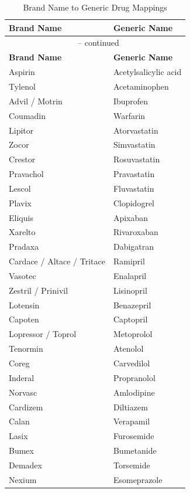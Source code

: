 \documentclass[11pt,a4paper]{article}
\begin{document}
\begin{longtable}{ll}
\caption{Brand Name to Generic Drug Mappings} \\
\toprule
\textbf{Brand Name} & \textbf{Generic Name} \\
\midrule
\endfirsthead
\multicolumn{2}{c}{{\tablename\ \thetable{} -- continued}} \\
\toprule
\textbf{Brand Name} & \textbf{Generic Name} \\
\midrule
\endhead
\bottomrule
\endfoot
\bottomrule
\endlastfoot
Aspirin & Acetylsalicylic acid \\
Tylenol & Acetaminophen \\
Advil / Motrin & Ibuprofen \\
Coumadin & Warfarin \\
\midrule
Lipitor & Atorvastatin \\
Zocor & Simvastatin \\
Crestor & Rosuvastatin \\
Pravachol & Pravastatin \\
Lescol & Fluvastatin \\
\midrule
Plavix & Clopidogrel \\
Eliquis & Apixaban \\
Xarelto & Rivaroxaban \\
Pradaxa & Dabigatran \\
\midrule
Cardace / Altace / Tritace & Ramipril \\
Vasotec & Enalapril \\
Zestril / Prinivil & Lisinopril \\
Lotensin & Benazepril \\
Capoten & Captopril \\
\midrule
Lopressor / Toprol & Metoprolol \\
Tenormin & Atenolol \\
Coreg & Carvedilol \\
Inderal & Propranolol \\
\midrule
Norvasc & Amlodipine \\
Cardizem & Diltiazem \\
Calan & Verapamil \\
\midrule
Lasix & Furosemide \\
Bumex & Bumetanide \\
Demadex & Torsemide \\
\midrule
Nexium & Esomeprazole \\

\end{longtable}
\end{document}
